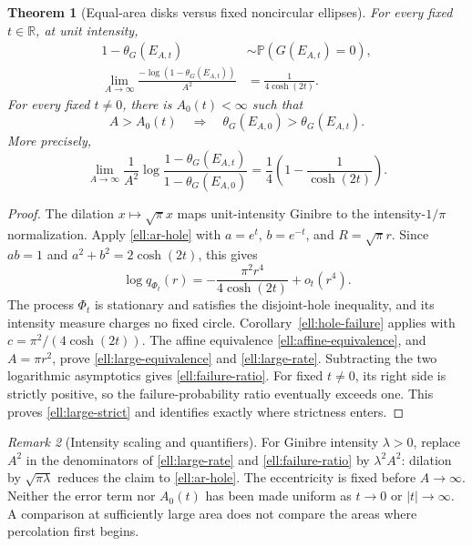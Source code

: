 \documentclass[11pt,a4paper]{article}
\newtheorem{theorem}{Theorem}
\theoremstyle{definition}
\theoremstyle{remark}
\newtheorem{remark}[theorem]{Remark}
\numberwithin{equation}{section}
\begin{document}
\begin{theorem}[Equal-area disks versus fixed noncircular ellipses]
\label{ell:large-area}
For every fixed $t\in\mathbb R$, at unit intensity,
\begin{align}
 1-\theta_G(E_{A,t})
  &\sim \mathbb P(G(E_{A,t})=0),\label{ell:large-equivalence}\\
 \lim_{A\to\infty}\frac{-\log(1-\theta_G(E_{A,t}))}{A^2}
  &=\frac1{4\cosh(2t)}.\label{ell:large-rate}
\end{align}
For every fixed $t\ne0$, there is $A_0(t)<\infty$ such that
\begin{equation}\label{ell:large-strict}
 A>A_0(t)\quad\Longrightarrow\quad
 \theta_G(E_{A,0})>\theta_G(E_{A,t}).
\end{equation}
More precisely,
\begin{equation}\label{ell:failure-ratio}
 \lim_{A\to\infty}\frac1{A^2}
  \log\frac{1-\theta_G(E_{A,t})}{1-\theta_G(E_{A,0})}
 =\frac14\left(1-\frac1{\cosh(2t)}\right).
\end{equation}
\end{theorem}

\begin{proof}
The dilation $x\mapsto\sqrt\pi x$ maps unit-intensity Ginibre to
the intensity-$1/\pi$ normalization.  Apply
\eqref{ell:ar-hole} with $a=e^t$, $b=e^{-t}$, and
$R=\sqrt\pi r$.  Since $ab=1$ and
$a^2+b^2=2\cosh(2t)$, this gives
\begin{equation}\label{ell:unit-hole}
 \log q_{\Phi_t}(r)
 =-\frac{\pi^2 r^4}{4\cosh(2t)}+o_t(r^4).
\end{equation}
The process $\Phi_t$ is stationary and satisfies the disjoint-hole
inequality, and its intensity measure charges no fixed circle.
Corollary~\ref{ell:hole-failure} applies with
$c=\pi^2/(4\cosh(2t))$.  The affine equivalence
\eqref{ell:affine-equivalence}, and $A=\pi r^2$, prove
\eqref{ell:large-equivalence} and \eqref{ell:large-rate}.
Subtracting the two logarithmic asymptotics gives
\eqref{ell:failure-ratio}.  For fixed $t\ne0$, its right side
is strictly positive, so the failure-probability ratio eventually
exceeds one.  This proves \eqref{ell:large-strict} and identifies
exactly where strictness enters.
\end{proof}

\begin{remark}[Intensity scaling and quantifiers]\label{ell:large-scope}
For Ginibre intensity $\lambda>0$, replace $A^2$ in the denominators
of \eqref{ell:large-rate} and \eqref{ell:failure-ratio} by
$\lambda^2A^2$: dilation by $\sqrt{\pi\lambda}$ reduces the
claim to \eqref{ell:ar-hole}.  The eccentricity is fixed before
$A\to\infty$.  Neither the error term nor $A_0(t)$ has been made
uniform as $t\to0$ or $|t|\to\infty$.  A comparison at sufficiently
large area does not compare the areas where percolation first begins.
\end{remark}
\end{document}
